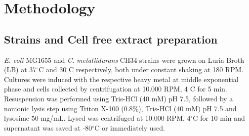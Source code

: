 \section{\textbf{Methodology }}

\subsection*{Strains and Cell free extract preparation}

\textit{E. coli} MG1655 and \textit{C. metallidurans} CH34 strains were grown on Luria Broth (LB) at 37$^{\circ}$C and 30$^{\circ}$C respectively, both under constant shaking at 180 RPM. Cultures were induced with the respective heavy metal at middle exponential phase and cells collected by centrifugation at 10.000 RPM, 4 C for 5 min. Resuspension was performed using Tris-HCl (40 mM) pH 7.5, followed by a nonionic lysis step using Triton X-100 (0.8\%), Tris-HCl (40 mM) pH 7.5 and lysosime 50 mg/mL. Lysed was centrifuged at 10.000 RPM, 4$^{\circ}$C for 10 min and supernatant was saved at -80$^{\circ}$C or immediately used.


